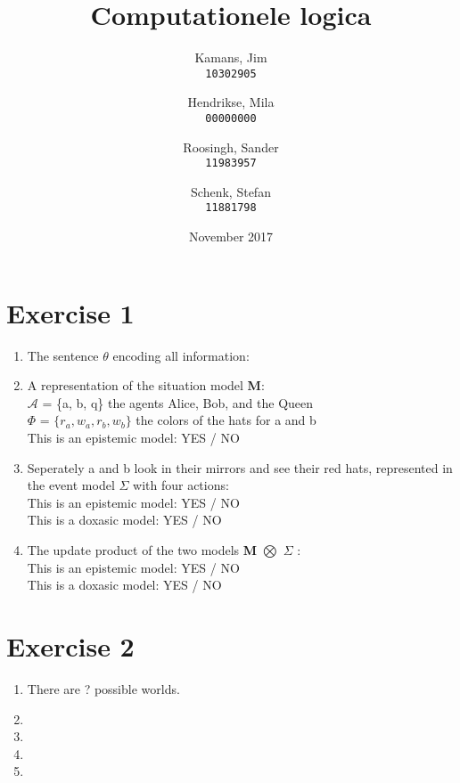 \documentclass[leqno]{article}
\title{Computationele logica}
\author{
    \small Kamans, Jim\\
    \texttt{10302905}
    \and
    \small Hendrikse, Mila\\
    \texttt{00000000}
    \and
    \small Roosingh, Sander\\
    \texttt{11983957}
    \and
    \small Schenk, Stefan\\
    \texttt{11881798}
}
\date{November 2017}
\begin{document}
\maketitle


\section{Exercise 1}

\begin{enumerate}

    \item The sentence $\theta$ encoding all information: \\

    \item A representation of the situation model \textbf{M}: \\
    $\mathcal{A}$ = \{a, b, q\} the agents Alice, Bob, and the Queen \\
    $\Phi$ = $\{r_a, w_a, r_b, w_b\}$ the colors of the hats for a and b \\

    This is an epistemic model: YES / NO \\

    \item Seperately a and b look in their mirrors and see their red hats, represented in the event model $\Sigma$ with four actions: \\

    This is an epistemic model: YES / NO \\
    This is a doxasic model: YES / NO \\

    \item The update product of the two models \textbf{M} $\bigotimes$ $\Sigma$ : \\

    This is an epistemic model: YES / NO \\
    This is a doxasic model: YES / NO \\

\end{enumerate}


\section{Exercise 2}

\begin{enumerate}

    \item There are ? possible worlds.
    \item
    \item
    \item
    \item

\end{enumerate}
\end{document}
